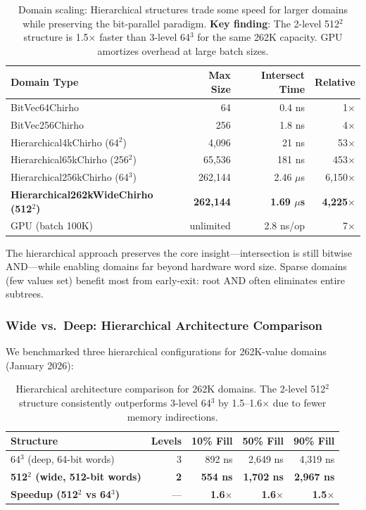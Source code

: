 \documentclass[11pt,a4paper]{article}
\begin{document}
\begin{table}[H]
\centering
\begin{tabular}{lrrr}
\toprule
\textbf{Domain Type} & \textbf{Max Size} & \textbf{Intersect Time} & \textbf{Relative} \\
\midrule
BitVec64Chirho & 64 & 0.4 ns & 1$\times$ \\
BitVec256Chirho & 256 & 1.8 ns & 4$\times$ \\
Hierarchical4kChirho (64$^2$) & 4,096 & 21 ns & 53$\times$ \\
Hierarchical65kChirho (256$^2$) & 65,536 & 181 ns & 453$\times$ \\
Hierarchical256kChirho (64$^3$) & 262,144 & 2.46 $\mu$s & 6,150$\times$ \\
\textbf{Hierarchical262kWideChirho (512$^2$)} & \textbf{262,144} & \textbf{1.69 $\mu$s} & \textbf{4,225$\times$} \\
GPU (batch 100K) & unlimited & 2.8 ns/op & 7$\times$ \\
\bottomrule
\end{tabular}
\caption{Domain scaling: Hierarchical structures trade some speed for larger domains while preserving the bit-parallel paradigm. \textbf{Key finding}: The 2-level 512$^2$ structure is 1.5$\times$ faster than 3-level 64$^3$ for the same 262K capacity. GPU amortizes overhead at large batch sizes.}
\label{tab:scaling}
\end{table}

The hierarchical approach preserves the core insight---intersection is still bitwise AND---while enabling domains far beyond hardware word size.
Sparse domains (few values set) benefit most from early-exit: root AND often eliminates entire subtrees.

\subsubsection{Wide vs.\ Deep: Hierarchical Architecture Comparison}

We benchmarked three hierarchical configurations for 262K-value domains (January 2026):

\begin{table}[H]
\centering
\begin{tabular}{lrrrr}
\toprule
\textbf{Structure} & \textbf{Levels} & \textbf{10\% Fill} & \textbf{50\% Fill} & \textbf{90\% Fill} \\
\midrule
64$^3$ (deep, 64-bit words) & 3 & 892 ns & 2,649 ns & 4,319 ns \\
\textbf{512$^2$ (wide, 512-bit words)} & \textbf{2} & \textbf{554 ns} & \textbf{1,702 ns} & \textbf{2,967 ns} \\
\midrule
\textbf{Speedup (512$^2$ vs 64$^3$)} & --- & \textbf{1.6$\times$} & \textbf{1.6$\times$} & \textbf{1.5$\times$} \\
\bottomrule
\end{tabular}
\caption{Hierarchical architecture comparison for 262K domains. The 2-level 512$^2$ structure consistently outperforms 3-level 64$^3$ by 1.5--1.6$\times$ due to fewer memory indirections.}
\label{tab:hierarchical_comparison}
\end{table}
\end{document}
